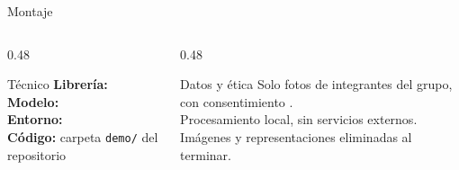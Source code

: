 \begin{frame}{Montaje}
  \begin{columns}[T]
    \begin{column}{0.48\textwidth}
      \begin{block}{T\'ecnico}
        \scriptsize
        \textbf{Librer\'ia:} \\[3pt]
        \textbf{Modelo:} \\[3pt]
        \textbf{Entorno:} \\[3pt]
        \textbf{C\'odigo:} carpeta \texttt{demo/} del repositorio
      \end{block}
    \end{column}
    \begin{column}{0.48\textwidth}
      \begin{exampleblock}{Datos y \'etica}
        \scriptsize
        Solo fotos de integrantes del grupo, con consentimiento
        .\\[3pt]
        Procesamiento local, sin servicios externos.\\[3pt]
        Im\'agenes y representaciones eliminadas al terminar.
      \end{exampleblock}
    \end{column}
  \end{columns}
\end{frame}

